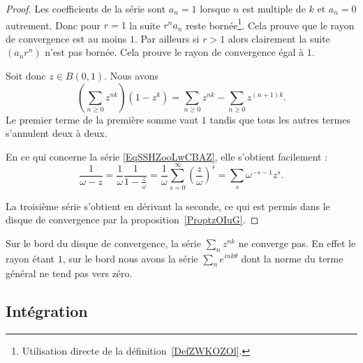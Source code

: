 \begin{proof}
    Les coefficients de la série sont \( a_n=1\) lorsque \( n\) est multiple de \( k\) et \( a_n=0\) autrement. Donc pour \( r=1\) la suite \( r^na_n\) reste bornée\footnote{Utilisation directe de la définition~\ref{DefZWKOZOl}.}. Cela prouve que le rayon de convergence est au moins \( 1\). Par ailleurs si \( r>1\) alors clairement la suite \( (a_nr^n)\) n'est pas bornée. Cela prouve le rayon de convergence égal à \( 1\).

    Soit donc \( z\in B(0,1)\). Nous avons
    \begin{equation}
        \left( \sum_{n\geq 0}z^{nk} \right)(1-z^k)=\sum_{n\geq 0}z^{nk}-\sum_{n\geq 0}z^{(n+1)k}.
    \end{equation}
    Le premier terme de la première somme vaut \( 1\) tandis que tous les autres termes s'annulent deux à deux.

    En ce qui concerne la série \eqref{EqSSHZooLwCBAZ}, elle s'obtient facilement :
    \begin{equation}
        \frac{1}{ \omega-z }=\frac{1}{  \omega }\frac{1}{ 1-\frac{ z }{ \omega } }=\frac{1}{ \omega }\sum_{s=0}^{\infty}\left( \frac{ z }{ \omega } \right)^s=\sum_s\omega^{-s-1}z^s.
    \end{equation}

    La troisième série s'obtient en dérivant la seconde, ce qui est permis dans le disque de convergence par la proposition~\ref{ProptzOIuG}.
\end{proof}

\begin{remark}
    Sur le bord du disque de convergence, la série \( \sum_nz^{nk}\) ne converge pas. En effet le rayon étant \( 1\), sur le bord nous avons la série \( \sum_n e^{ink\theta}\) dont la norme du terme général ne tend pas vers zéro.
\end{remark}

\subsection{Intégration}

